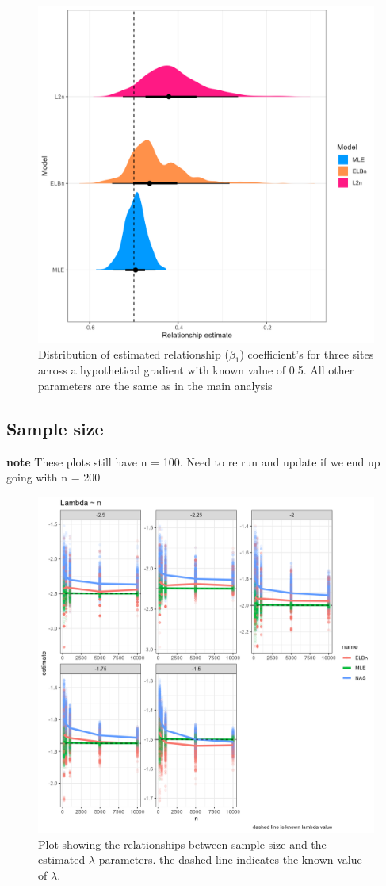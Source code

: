 \documentclass[
]{article}
\begin{document}
\begin{figure}
\centering
\includegraphics{figures/PLB_3_sites_relationship_density.png}
\caption{Distribution of estimated relationship (\(\beta_1\))
coefficient's for three sites across a hypothetical gradient with known
value of 0.5. All other parameters are the same as in the main analysis}
\end{figure}

\hypertarget{sample-size}{%
\subsection{Sample size}\label{sample-size}}

\textbf{note} These plots still have n = 100. Need to re run and update
if we end up going with n = 200

\begin{figure}
\centering
\includegraphics{figures/lambda_n_5_sites.png}
\caption{Plot showing the relationships between sample size and the
estimated \(\lambda\) parameters. the dashed line indicates the known
value of \(\lambda\).}
\end{figure}
\end{document}
